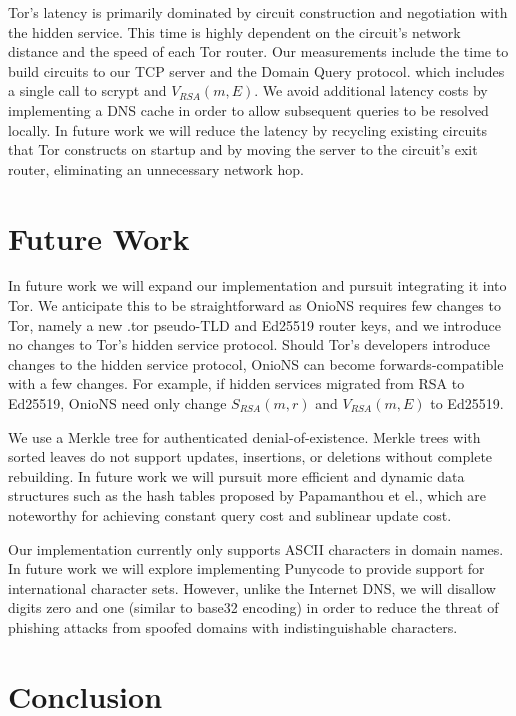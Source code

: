 \documentclass{sig-alternate}
\begin{document}
Tor's latency is primarily dominated by circuit construction and negotiation with the hidden service. This time is highly dependent on the circuit's network distance and the speed of each Tor router. Our measurements include the time to build circuits to our TCP server and the Domain Query protocol. which includes a single call to scrypt and $ V_{\mathit{RSA}}(m, E) $. We avoid additional latency costs by implementing a DNS cache in order to allow subsequent queries to be resolved locally. In future work we will reduce the latency by recycling existing circuits that Tor constructs on startup and by moving the server to the circuit's exit router, eliminating an unnecessary network hop.

\section{Future Work}

In future work we will expand our implementation and pursuit integrating it into Tor. We anticipate this to be straightforward as OnioNS requires few changes to Tor, namely a new .tor pseudo-TLD and Ed25519 router keys, and we introduce no changes to Tor's hidden service protocol. Should Tor's developers introduce changes to the hidden service protocol, OnioNS can become forwards-compatible with a few changes. For example, if hidden services migrated from RSA to Ed25519, OnioNS need only change $ S_{\mathit{RSA}}(m, r) $ and $ V_{\mathit{RSA}}(m, E) $ to Ed25519.

We use a Merkle tree for authenticated denial-of-existence. Merkle trees with sorted leaves do not support updates, insertions, or deletions without complete rebuilding. In future work we will pursuit more efficient and dynamic data structures such as the hash tables proposed by Papamanthou et el.\cite{papamanthou2008authenticated}, which are noteworthy for achieving constant query cost and sublinear update cost.

Our implementation currently only supports ASCII characters in domain names. In future work we will explore implementing Punycode to provide support for international character sets. However, unlike the Internet DNS, we will disallow digits zero and one (similar to base32 encoding) in order to reduce the threat of phishing attacks from spoofed domains with indistinguishable characters.

\section{Conclusion}
\end{document}
